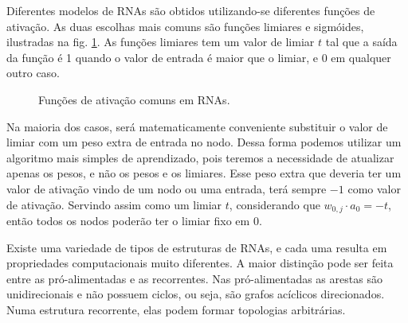 Diferentes modelos de RNAs são obtidos utilizando-se diferentes funções de ativação. As duas escolhas mais comuns são funções limiares e sigmóides, ilustradas na fig. \ref{fig:func:rna}. As funções limiares tem um valor de limiar $t$ tal que a saída da função é 1 quando o valor de entrada é maior que o limiar, e 0 em qualquer outro caso.

\begin{figure}[ht]
 \begin{center}
 \end{center}
 \caption{Funções de ativação comuns em RNAs.}
 \label{fig:func:rna}
\end{figure}

Na maioria dos casos, será matematicamente conveniente substituir o valor de limiar com um peso extra de entrada no nodo. Dessa forma podemos utilizar um algoritmo mais simples de aprendizado, pois teremos a necessidade de atualizar apenas os pesos, e não os pesos e os limiares. Esse peso extra que deveria ter um valor de ativação vindo de um nodo ou uma entrada, terá sempre $-1$ como valor de ativação. Servindo assim como um limiar $t$, considerando que $w_{0,j} \cdot a_0 = -t$, então todos os nodos poderão ter o limiar fixo em 0.

Existe uma variedade de tipos de estruturas de RNAs, e cada uma resulta em propriedades computacionais muito diferentes. A maior distinção pode ser feita entre as pró-alimentadas e as recorrentes. Nas pró-alimentadas as arestas são unidirecionais e não possuem ciclos, ou seja, são grafos acíclicos direcionados. Numa estrutura recorrente, elas podem formar topologias arbitrárias.

